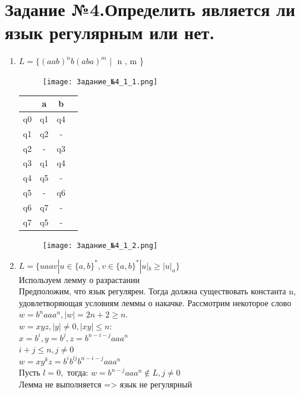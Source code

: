 \documentclass[a4paper]{article}
\begin{document}
\section{Задание №4.Определить является ли язык регулярным или нет.}
\begin{enumerate}
\item $L = \{(aab)^n b(aba)^m  $ | $ $ n , m  \}

\begin{figure}[h]
\centering
\texttt{[image: Задание\_№4\_1\_1.png]}
\end{figure}
\begin{tabular}{|*{4}{c|}}
\textbf{ } & a & b \\
\hline\hline
q0 & q1 & q4  \\
\hline\hline
q1 & q2 & - \\
\hline\hline
q2 & - & q3 \\
\hline\hline
q3 & q1 & q4 \\
\hline\hline
q4 & q5 & - \\
\hline\hline
q5 & - & q6 \\
\hline\hline
q6 & q7 & - \\
\hline\hline
q7 & q5 & - \\
\end{tabular}

\begin{figure}[h]
\centering
\texttt{[image: Задание\_№4\_1\_2.png]}
\end{figure}


\item $L = \{ uaav  | u \in \{a,b\}^* ,  v \in \{a, b\}^* |u|_b\ge|u|_a  \}$
\\ Используем лемму о разрастании\\
Предположим, что язык регулярен. Тогда должна существовать константа n, удовлетворяющая условиям леммы о накачке. Рассмотрим некоторое слово
$w = b^naaa^n, |w| = 2n+2 \ge n.$\\
$w = xyz, |y| \ne 0, |xy| \le n:$\\
$x = b^i, y = b^j, z = b^{n-i-j}aaa^n$\\
$i + j \le n, j \ne 0 $\\
$w = xy^kz=b^ib^{lj}b^{n-i-j}aaa^n$\\
Пусть $l=0,$ тогда: $w = b^{n-j}aaa^n \notin L  ,j \ne 0$\\
Лемма не выполняется => язык не регулярный\\


\end{enumerate}
\end{document}
